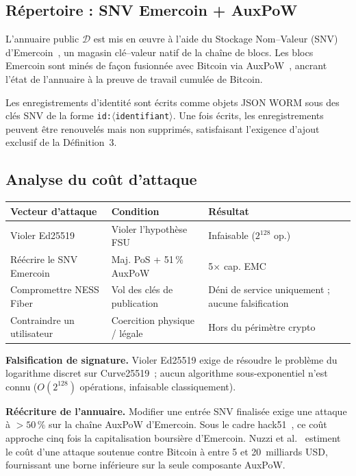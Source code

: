 \documentclass[11pt,a4paper]{article}
\begin{document}
\subsection{Répertoire : SNV Emercoin + AuxPoW}

L'annuaire public $\mathcal{D}$ est mis en \oe{}uvre à l'aide du Stockage
Nom--Valeur (SNV) d'Emercoin~\cite{emercoin}, un magasin clé--valeur natif de la chaîne de blocs.  Les blocs Emercoin sont minés de façon fusionnée avec
Bitcoin via AuxPoW~\cite{hack51}, ancrant l'état de l'annuaire à la preuve
de travail cumulée de Bitcoin.

Les enregistrements d'identité sont écrits comme objets JSON WORM sous des
clés SNV de la forme \texttt{id:$\langle$identifiant$\rangle$}.  Une fois
écrits, les enregistrements peuvent être renouvelés mais non supprimés,
satisfaisant l'exigence d'ajout exclusif de la Définition~3.

\subsection{Analyse du coût d'attaque}

\begin{center}
\begin{tabular}{lll}
  \toprule
  \textbf{Vecteur d'attaque} & \textbf{Condition} & \textbf{Résultat} \\
  \midrule
  Violer Ed25519       & Violer l'hypothèse FSU & Infaisable ($2^{128}$ op.) \\
  Réécrire le SNV Emercoin & Maj. PoS + 51\,\% AuxPoW & 5$\times$ cap. EMC~\cite{hack51} \\
  Compromettre NESS Fiber  & Vol des clés de publication & Déni de service uniquement ; aucune falsification \\
  Contraindre un utilisateur & Coercition physique / légale & Hors du périmètre crypto \\
  \bottomrule
\end{tabular}
\end{center}

\textbf{Falsification de signature.}  Violer Ed25519 exige de résoudre le
problème du logarithme discret sur Curve25519~; aucun algorithme sous-exponentiel
n'est connu ($O(2^{128})$ opérations, infaisable classiquement).

\textbf{Réécriture de l'annuaire.}  Modifier une entrée SNV finalisée exige
une attaque à $>50\,\%$ sur la chaîne AuxPoW d'Emercoin.  Sous le cadre
hack51~\cite{hack51}, ce coût approche cinq fois la capitalisation boursière
d'Emercoin.  Nuzzi et al.~\cite{nuzzi2024} estiment le coût d'une attaque
soutenue contre Bitcoin à entre 5 et 20~milliards USD, fournissant une borne
inférieure sur la seule composante AuxPoW.
\end{document}
